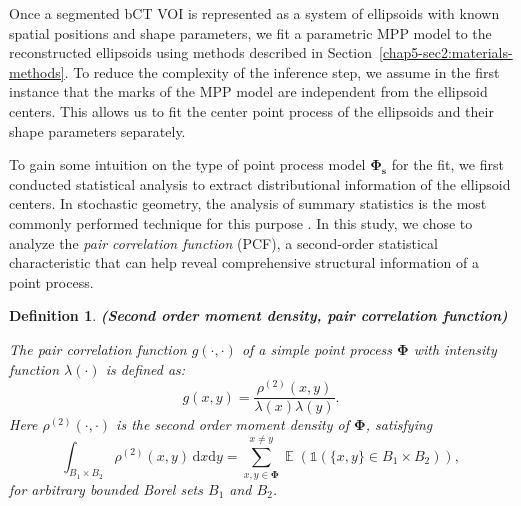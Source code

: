 \documentclass[journal]{IEEEtran}
\DeclareMathOperator{\E}{\mathbb{E}}%
\newcommand{\dd}[1]{\mathrm{d}#1}%
\newcommand{\sidenote}[1]{\textnormal{\textbf{(#1)}}}%
\newtheorem{define}{Definition}[section]%
\begin{document}
Once a segmented bCT VOI is represented as a system of ellipsoids with
known spatial positions and shape parameters, we fit a parametric MPP
model to the reconstructed ellipsoids using methods described in
Section~\ref{chap5-sec2:materials-methods}. To reduce the complexity
of the inference step, we assume in the first instance that the marks
of the MPP model are independent from the ellipsoid centers. This
allows us to fit the center point process of the ellipsoids and their
shape parameters separately.


To gain some intuition on the type of point process model
$\mathbf{\Phi_s}$ for the fit, we first conducted statistical analysis
to extract distributional information of the ellipsoid centers. In
stochastic geometry, the analysis of summary statistics is the most
commonly performed technique for this purpose
\cite{chiu2013stochastic}. In this study, we chose to analyze the
\textit{pair correlation function} (PCF), a second-order statistical
characteristic that can help reveal comprehensive structural
information of a point process.

\begin{define} \sidenote{Second order moment density, pair correlation
    function} \textnormal{\cite[p34]{baddeley2007spatial}}

  The pair correlation function \textit{$g(\cdot, \cdot)$} of a simple
  point process $\mathbf{\Phi}$ with intensity function
  $\lambda(\cdot)$ is defined as:
  \begin{equation}
    \label{eq:pcf-official-def}
    g(x,y)=\frac{\rho^{(2)}(x,y)}{\lambda(x) \lambda(y)}.
  \end{equation}
  Here $\rho^{(2)}(\cdot, \cdot)$ is the second order moment density
  of $\mathbf{\Phi}$, satisfying
  \begin{equation}
    \label{eq:second-order-moment}
    \int_{B_{1} \times B_{2}} \rho^{(2)}(x,y) \, \dd x \dd y
    = \sum^{x \neq y}_{x,y \in \mathbf{\Phi}} \E \left( \mathds{1} (
      \{x,y \} \in B_{1} \times B_{2} ) \right),
  \end{equation}
  for arbitrary bounded Borel sets $B_1$ and $B_2$.
\end{define}
\end{document}
